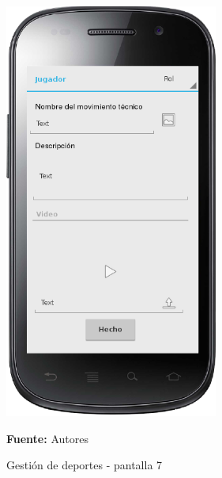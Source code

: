 \begin{figure}[!htb]
  \begin{center}
    \includegraphics[width=7cm]{./imagenes/UI/Deportes/gestion_deportes_7.png}
    \caption{Gestión de deportes - pantalla 7}
    \label{fig:gestion_deportes_7}
    \textbf{Fuente:}  Autores
  \end{center}
\end{figure}

